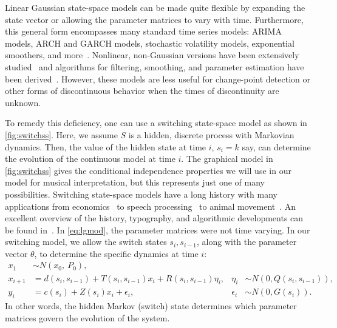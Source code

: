 \documentclass[12pt]{article}
\begin{document}
Linear Gaussian state-space models can be made quite flexible
by expanding the state vector or allowing the parameter matrices to
vary with time. Furthermore, this general form encompasses many
standard time series models: ARIMA models, ARCH and GARCH models,
stochastic volatility models, exponential smoothers, and
more~\citep[see][for many other
examples]{DurbinKoopman2001}. Nonlinear, non-Gaussian versions have
been extensively
studied~\citep{DurbinKoopman1997,Fuh2006,Kitagawa1987,Kitagawa1996}
and algorithms for filtering, smoothing, and parameter estimation have
been derived~\citep[e.g.,][]{KoyamaPerez-Bolde2010,AndrieuDoucet2010}. 
However, these models are less useful
for change-point detection or other forms of discontinuous behavior
when the times of discontinuity are unknown. 

To remedy this deficiency, one can use a switching state-space
model as shown in \autoref{fig:switchss}. Here, we assume $S$ is a
hidden, discrete process with Markovian dynamics. Then, the value of
the hidden state at time $i$, $s_i=k$ say, can determine the evolution of
the continuous model at time $i$. The graphical model in
\autoref{fig:switchss} gives the conditional independence properties
we will use in our model for musical interpretation, but this
represents just one of many possibilities. Switching state-space models have a long
history with many applications from
economics~\citep{KimNelson1998,Kim1994,Hamilton2011} to speech
processing~\citep{FoxSudderth2011} to animal
movement~\citep{PattersonThomas2008,BlockJonsen2011}. An excellent
overview of the history, typography, and algorithmic developments can
be found in~\citep{GhahramaniHinton2000}. In \eqref{eq:lgmod}, the
parameter matrices were not time varying. In our switching model, we
allow the switch states $s_i, s_{i-1}$, along with the parameter
vector $\theta$, to determine the specific dynamics at time $i$:
\begin{equation}
  \begin{aligned}
    x_1 &\sim N(x_0,\ P_0),\\
    x_{i+1}&= d(s_i,s_{i-1})+T(s_i,s_{i-1}) x_i +
    R(s_i,s_{i-1})\eta_i, 
    & \eta_i &\sim N(0,Q(s_i,s_{i-1})),\\
    y_i&= c(s_i) + Z(s_i) x_i + \epsilon_i, & \epsilon_i &\sim N(0, G(s_i)).
  \end{aligned}
\end{equation}
In other words, the hidden Markov (switch) state determines which parameter
matrices govern the evolution of the system. 
\end{document}
